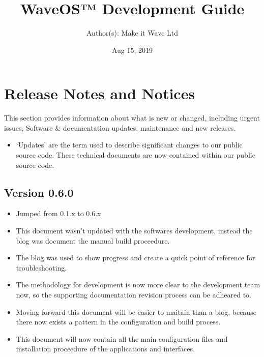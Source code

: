 \documentclass[letterpaper,10pt,openany,oneside,english]{sphinxmanual}
\title{WaveOS™ Development Guide}
\date{Aug 15, 2019}
\author{Author(s): Make it Wave Ltd}
\begin{document}
\maketitle
\sphinxtableofcontents
{}\label{\detokenize{index::doc}}




\chapter{Release Notes and Notices}
\label{\detokenize{releasenotes:release-notes-and-notices}}\label{\detokenize{releasenotes::doc}}
This section provides information about what is new or changed, including urgent issues, Software \& documentation updates, maintenance and new releases.
\begin{itemize}
\item {} 
‘Updates’ are the term used to describe significant changes to our public source code. These technical documents are now contained within our public source code.

\end{itemize}


\section{Version 0.6.0}
\label{\detokenize{releasenotes:version-0-6-0}}\begin{itemize}
\item {} 
Jumped from 0.1.x to 0.6.x

\item {} 
This document wasn’t updated with the softwares development, instead the blog was document the manual build proceedure.

\item {} 
The blog was used to show progress and create a quick point of reference for troubleshooting.

\item {} 
The methodology for development is now more clear to the development team now, so the supporting documentation revision process can be adheared to.

\item {} 
Moving forward this document will be easier to maitain than a blog, because there now exists a pattern in the configuration and build process.

\item {} 
This document will now contain all the main configuration files and installation proceedure of the applications and interfaces.

\end{itemize}
\end{document}
